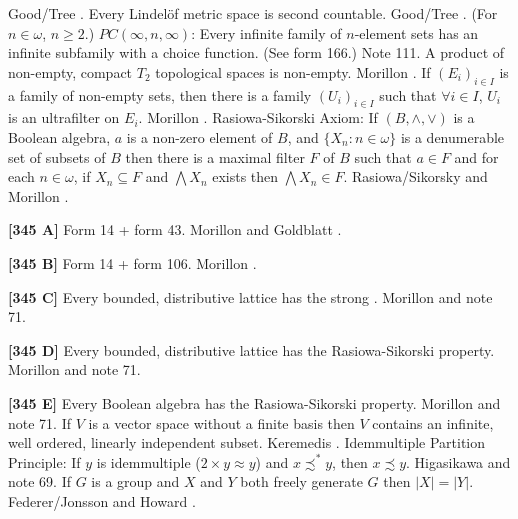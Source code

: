 \ac{Good/Tree} \cite{1995}.
\medskip
{} Every Lindel\"of metric space is second countable.
\ac{Good/Tree} \cite{1995}.
\medskip
{}  (For $n\in\omega$, $n\ge 2$.)
$PC(\infty,n,\infty)$:  Every infinite family of $n$-element sets has
an infinite subfamily with a choice function. (See form 166.) Note 111.
\medskip
{}  A product of non-empty, compact $T_2$
topological spaces is non-empty.  \ac{Morillon} \cite{1988}.
\medskip
{}  If $(E_i)_{i\in I}$ is a family of non-empty
sets, then there is a family $(U_i)_{i\in I}$ such that $\forall i\in I$,
$U_i$ is an ultrafilter on $E_i$.  \ac{Morillon} \cite{1988}.
\medskip
{}  Rasiowa-Sikorski Axiom:  If $(B,\land,\lor)$
is a Boolean algebra, $a$ is a non-zero element of $B$, and
$\{X_n: n\in\omega\}$ is a denumerable set of subsets of $B$ then
there is a maximal filter $F$ of $B$ such that $a\in F$ and for
each $n\in\omega$, if $X_n\subseteq F$ and $\bigwedge X_n$ exists then
$\bigwedge X_n \in F$. \ac{Rasiowa/Sikorsky} \cite{1950} and  \ac{Morillon}
\cite{1988}.
\smallskip
\item{}{\bf [345 A]}  Form 14 + form 43.  \ac{Morillon} \cite{1988}
and \ac{Goldblatt} \cite{1985}.
\smallskip
\item{}{\bf [345 B]}  Form 14 + form 106.  \ac{Morillon} \cite{1988}.
\smallskip
\item{}{\bf [345 C]}  Every bounded, distributive lattice has the strong
.  \ac{Morillon} \cite{1988} and note 71.
\smallskip
\item{}{\bf [345 D]}  Every bounded, distributive lattice has the
Rasiowa-Sikorski property.  \ac{Morillon} \cite{1988} and note 71.
\smallskip
\item{}{\bf [345 E]}  Every Boolean algebra has the Rasiowa-Sikorski
property.  \ac{Morillon} \cite{1988} and note 71.
\medskip
{}  If $V$ is a vector space without a finite basis
then $V$ contains an infinite, well ordered, linearly independent subset.
Keremedis \cite{2001a}.
\medskip
{} Idemmultiple Partition Principle: If $y$ is
idemmultiple ($2\times y\approx y$) and $x\precsim ^* y$, then
$x\precsim y$. \ac{Higasikawa} \cite{1995} and note 69.
\medskip
{}  If $G$ is a group and $X$ and $Y$ both
freely generate $G$ then $|X| = |Y|$.  \ac{Federer/Jonsson} \cite{1950}
and \ac{Howard} \cite{1985}.
